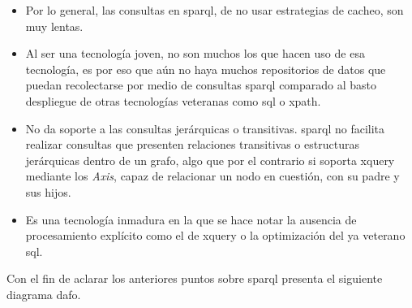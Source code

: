 \begin{itemize}
	\item Por lo general, las consultas en \acrshort{sparql}, de no usar estrategias de cacheo\cite{SPARQL_Performance}, son muy lentas.

	\item Al ser una tecnología joven, no son muchos los que hacen uso de esa tecnología, es por eso que aún no haya muchos repositorios de datos que puedan recolectarse por medio de consultas \acrshort{sparql} comparado al basto despliegue de otras tecnologías veteranas como \acrshort{sql} o \acrshort{xpath}\cite{XPath}.

	\item No da soporte a las consultas jerárquicas o transitivas. \acrshort{sparql} no facilita realizar consultas que presenten relaciones transitivas o estructuras jerárquicas dentro de un grafo, algo que por el contrario si soporta \acrshort{xquery} mediante los \textit{Axis}, capaz de relacionar un nodo en cuestión, con su padre y sus hijos\cite{XQueryAxes}.

	\item Es una tecnología inmadura en la que se hace notar la ausencia de procesamiento explícito como el de \acrshort{xquery} o la optimización del ya veterano \acrshort{sql}.
\end{itemize}

Con el fin de aclarar los anteriores puntos sobre \acrshort{sparql} presenta el siguiente diagrama \acrfull{dafo}.

